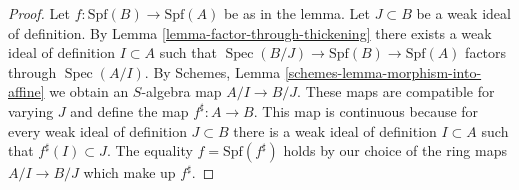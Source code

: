 \documentclass{stacks-project}
\theoremstyle{plain}
\theoremstyle{definition}
\theoremstyle{remark}
\numberwithin{equation}{subsection}
\def\Spec{\mathop{\mathrm{Spec}}}
\begin{document}
\begin{proof}
Let $f : \text{Spf}(B) \to \text{Spf}(A)$ be as in the lemma.
Let $J \subset B$ be a weak ideal of definition. By
Lemma \ref{lemma-factor-through-thickening}
there exists a weak ideal of definition $I \subset A$ such that
$\Spec(B/J) \to \text{Spf}(B) \to \text{Spf}(A)$
factors through $\Spec(A/I)$. By
Schemes, Lemma \ref{schemes-lemma-morphism-into-affine}
we obtain an $S$-algebra map $A/I \to B/J$.
These maps are compatible for varying $J$ and define the
map $f^\sharp : A \to B$. This map is continuous because
for every weak ideal of definition $J \subset B$ there is a
weak ideal of definition $I \subset A$ such that
$f^\sharp(I) \subset J$. The equality $f = \text{Spf}(f^\sharp)$
holds by our choice of the ring maps $A/I \to B/J$ which make up $f^\sharp$.
\end{proof}
\end{document}
